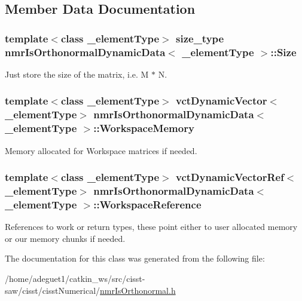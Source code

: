 \subsection{Member Data Documentation}
\hypertarget{classnmr_is_orthonormal_dynamic_data_a0335e18e8d4291e9c9ce6f6c3b7f68f0}{
\subsubsection[{Size}]{\setlength{\rightskip}{0pt plus 5cm}template$<$class \-\_\-element\-Type$>$ {\bf size\-\_\-type} {\bf nmr\-Is\-Orthonormal\-Dynamic\-Data}$<$ \-\_\-element\-Type $>$\-::Size\hspace{0.3cm}{\ttfamily [protected]}}}\label{classnmr_is_orthonormal_dynamic_data_a0335e18e8d4291e9c9ce6f6c3b7f68f0}
Just store the size of the matrix, i.\-e. M $\ast$ N. \hypertarget{classnmr_is_orthonormal_dynamic_data_aa64db85fa3c9904a4fb2c917dd171ae6}{
\subsubsection[{Workspace\-Memory}]{\setlength{\rightskip}{0pt plus 5cm}template$<$class \-\_\-element\-Type$>$ {\bf vct\-Dynamic\-Vector}$<$\-\_\-element\-Type$>$ {\bf nmr\-Is\-Orthonormal\-Dynamic\-Data}$<$ \-\_\-element\-Type $>$\-::Workspace\-Memory\hspace{0.3cm}{\ttfamily [protected]}}}\label{classnmr_is_orthonormal_dynamic_data_aa64db85fa3c9904a4fb2c917dd171ae6}
Memory allocated for Workspace matrices if needed. \hypertarget{classnmr_is_orthonormal_dynamic_data_a70b7864b872ab20af9400584387f3c21}{
\subsubsection[{Workspace\-Reference}]{\setlength{\rightskip}{0pt plus 5cm}template$<$class \-\_\-element\-Type$>$ {\bf vct\-Dynamic\-Vector\-Ref}$<$\-\_\-element\-Type$>$ {\bf nmr\-Is\-Orthonormal\-Dynamic\-Data}$<$ \-\_\-element\-Type $>$\-::Workspace\-Reference\hspace{0.3cm}{\ttfamily [protected]}}}\label{classnmr_is_orthonormal_dynamic_data_a70b7864b872ab20af9400584387f3c21}
References to work or return types, these point either to user allocated memory or our memory chunks if needed. 

The documentation for this class was generated from the following file\-:\begin{DoxyCompactItemize}
\item 
/home/adeguet1/catkin\-\_\-ws/src/cisst-\/saw/cisst/cisst\-Numerical/\hyperlink{nmr_is_orthonormal_8h}{nmr\-Is\-Orthonormal.\-h}\end{DoxyCompactItemize}
